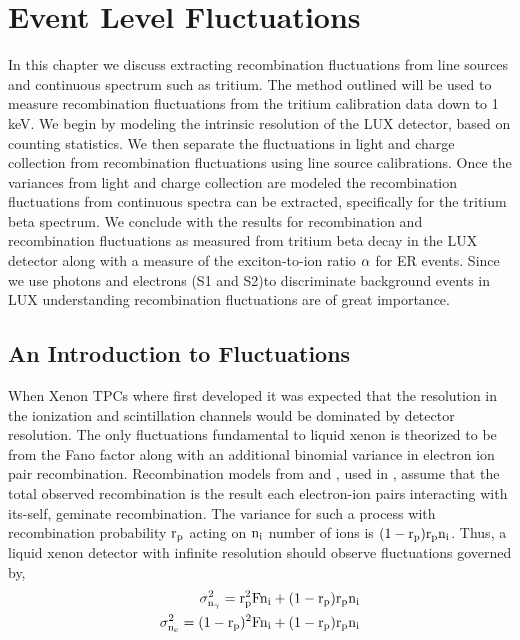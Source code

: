 \renewcommand{\thechapter}{5}
\newcommand{\rp}{$\rm r_p \: $}

\chapter{Event Level Fluctuations}
\label{Ch:Flucs}

In this chapter we discuss extracting recombination fluctuations from line sources and continuous spectrum such as tritium. The method outlined will be used to measure recombination fluctuations from the tritium calibration data down to 1 keV. We begin by modeling the intrinsic resolution of the LUX detector, based on counting statistics. We then separate the fluctuations in light and charge collection from recombination fluctuations using line source calibrations. Once the variances from light and charge collection are modeled the recombination fluctuations from continuous spectra can be extracted, specifically for the tritium beta spectrum. We conclude with the results for recombination and recombination fluctuations as measured from tritium beta decay in the LUX detector along with a measure of the exciton-to-ion ratio $\rm \alpha$ for ER events. Since we use photons and electrons (S1 and S2)to discriminate background events in LUX understanding recombination fluctuations are of great importance.

\section{An Introduction to Fluctuations}

When Xenon TPCs where first developed it was expected that the resolution in the ionization and scintillation channels would be dominated by detector resolution. The only fluctuations fundamental to liquid xenon is theorized to be from the Fano factor along with an additional binomial variance in electron ion pair recombination. Recombination models from \cite{Thomas_Imel} and \cite{Birks}, used in \cite{NEST_2013}, assume that the total observed recombination is the result each electron-ion pairs interacting with its-self, geminate recombination. The variance for such a process with recombination probability $\rm r_p$ acting on $\rm n_i$ number of ions is $\rm (1-r_p)r_pn_i$. Thus, a liquid xenon detector with infinite resolution should observe fluctuations governed by, 
\begin{equation}
\begin{split}
\rm \sigma_{n_\gamma}^2=r_p^2Fn_i + (1-r_p)r_p n_i \\
\rm \sigma_{n_e}^2=(1-r_p)^2Fn_i + (1-r_p)r_p n_i
\label{eq:Fano_Intro}
\end{split}
\end{equation}

